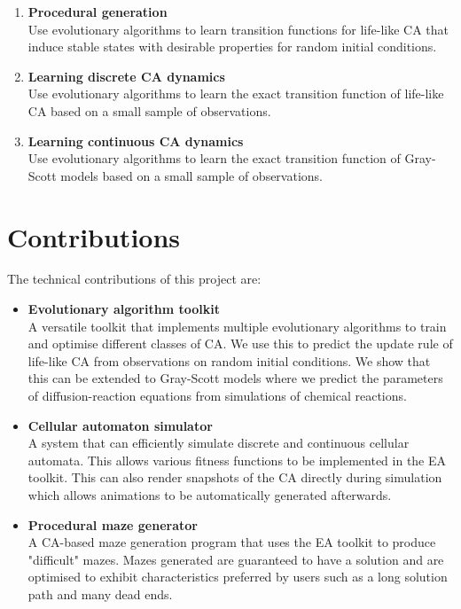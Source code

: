 \begin{enumerate}
    \item \textbf{Procedural generation}\label{obj-1}\\
    Use evolutionary algorithms to learn transition functions for life-like CA that induce stable states with desirable properties for random initial conditions.
    \item \textbf{Learning discrete CA dynamics}\label{obj-1}\\
    Use evolutionary algorithms to learn the exact transition function of life-like CA based on a small sample of observations.
    \item \textbf{Learning continuous CA dynamics}\\
    Use evolutionary algorithms to learn the exact transition function of Gray-Scott models based on a small sample of observations.
\end{enumerate}



\section{Contributions} 
The technical contributions of this project are:
\begin{itemize}
    \item \textbf{Evolutionary algorithm toolkit}\\ A versatile toolkit that implements multiple evolutionary algorithms to train and optimise different classes of CA. We use this to predict the update rule of life-like CA from observations on random initial conditions. We show that this can be extended to Gray-Scott models where we predict the parameters of diffusion-reaction equations from simulations of chemical reactions.
    \item \textbf{Cellular automaton simulator}\\ A system that can efficiently simulate discrete and continuous cellular automata. This allows various fitness functions to be implemented in the EA toolkit. This can also render snapshots of the CA directly during simulation which allows animations to be automatically generated afterwards.
    \item \textbf{Procedural maze generator}\\ A CA-based maze generation program that uses the EA toolkit to produce "difficult" mazes. Mazes generated are guaranteed to have a solution and are optimised to exhibit characteristics preferred by users such as a long solution path and many dead ends.
\end{itemize}

